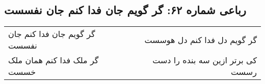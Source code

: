 \begin{center}
\section*{رباعی شماره ۶۲: گر گویم جان فدا کنم جان نفسست}
\label{sec:sh062}
\begin{longtable}{l p{0.5cm} r}
گر گویم جان فدا کنم جان نفسست
&&
گر گویم دل فدا کنم دل هوسست
\\
گر ملک فدا کنم همان ملک خسست
&&
کی برتر ازین سه بنده را دست رسست
\\
\end{longtable}
\end{center}
